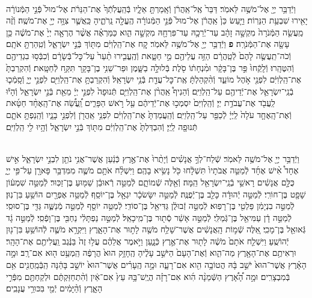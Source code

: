 \documentclass[twoside, openany, parskip=half, 11pt]{book}
\begin{document}
\begin{footnotesize}
\begin{multicols}{2}
\\
וַיְֿדַבֵּ֥ר יְיָ֖ אֶל־מֹשֶׁ֥ה לֵּאמֹֽר׃ דַּבֵּר֙ אֶֽל־אַֽהֲרֹ֔ן וְֿאָֽמַרְתָּ֖ אֵלָ֑יו בְּֿהַֽעֲלֹֽתְֿךָ֙ אֶת־הַנֵּרֹ֔ת אֶל־מוּל֙ פְּֿנֵ֣י הַמְּֿנוֹרָ֔ה יָאִ֖ירוּ שִׁבְעַ֥ת הַנֵּרֽוֹת׃ וַיַּ֤עַשׂ כֵּן֙ אַֽהֲרֹ֔ן אֶל־מוּל֙ פְּֿנֵ֣י הַמְּֿנוֹרָ֔ה הֶֽעֱלָ֖ה נֵֽרֹתֶ֑יהָ כַּֽאֲשֶׁ֛ר צִוָּ֥ה יְיָ֖ אֶת־מֹשֶֽׁה׃ וְֿזֶ֨ה מַֽעֲשֵׂ֤ה הַמְּֿנֹרָה֙ מִקְשָׁ֣ה זָהָ֔ב עַד־יְֿרֵכָ֥הּ עַד־פִּרְחָ֖הּ מִקְשָׁ֣ה הִ֑וא כַּמַּרְאֶ֗ה אֲשֶׁ֨ר הֶרְאָ֤ה יְיָ֙ אֶת־מֹשֶׁ֔ה כֵּ֥ן עָשָׂ֖ה אֶת־הַמְּֿנֹרָֽה׃ \textbf{פ}
וַיְֿדַבֵּ֥ר יְיָ֖ אֶל־מֹשֶׁ֥ה לֵּאמֹֽר׃ קַ֚ח אֶת־הַֽלְוִיִּ֔ם מִתּ֖וֹךְ בְּֿנֵ֣י יִשְׂרָאֵ֑ל וְֿטִֽהַרְתָּ֖ אֹתָֽם׃ וְֿכֹה־תַֽעֲשֶׂ֤ה לָהֶם֙ לְֿטַֽהֲרָ֔ם הַזֵּ֥ה עֲלֵיהֶ֖ם מֵ֣י חַטָּ֑את וְֿהֶֽעֱבִ֤ירוּ תַ֨עַר֙ עַל־כׇּל־בְּֿשָׂרָ֔ם וְֿכִבְּֿס֥וּ בִגְדֵיהֶ֖ם וְֿהִטֶּהָֽרוּ׃ וְֿלָֽקְֿחוּ֙ פַּ֣ר בֶּן־בָּקָ֔ר וּמִ֨נְחָת֔וֹ סֹ֖לֶת בְּֿלוּלָ֣ה בַשָּׁ֑מֶן וּפַר־שֵׁנִ֥י בֶן־בָּקָ֖ר תִּקַּ֥ח לְֿחַטָּֽאת׃ וְֿהִקְרַבְתָּ֙ אֶת־הַֽלְוִיִּ֔ם לִפְנֵ֖י אֹ֣הֶל מוֹעֵ֑ד וְֿהִ֨קְהַלְתָּ֔ אֶֽת־כׇּל־עֲדַ֖ת בְּֿנֵ֥י יִשְׂרָאֵֽל׃  וְֿהִקְרַבְתָּ֥ אֶת־הַֽלְוִיִּ֖ם לִפְנֵ֣י יְיָ֑ וְֿסָֽמְֿכ֧וּ בְֿנֵֽי־יִשְׂרָאֵ֛ל אֶת־יְֿדֵיהֶ֖ם עַל־הַֽלְוִיִּֽם׃ וְֿהֵנִיף֩ אַֽהֲרֹ֨ן אֶת־הַֽלְוִיִּ֤ם תְּֿנוּפָה֙ לִפְנֵ֣י יְיָ֔ מֵאֵ֖ת בְּֿנֵ֣י יִשְׂרָאֵ֑ל וְֿהָי֕וּ לַֽעֲבֹ֖ד אֶת־עֲבֹדַ֥ת יְיָ׃ וְֿהַֽלְוִיִּם֙ יִסְמְכ֣וּ אֶת־יְֿדֵיהֶ֔ם עַ֖ל רֹ֣אשׁ הַפָּרִ֑ים וַֽ֠עֲשֵׂ֠ה אֶת־הָֽאֶחָ֨ד חַטָּ֜את וְֿאֶת־הָֽאֶחָ֤ד עֹלָה֙ לַֽיְיָ֔ לְֿכַפֵּ֖ר עַל־הַֽלְוִיִּֽם׃ וְֿהַֽעֲמַדְתָּ֙ אֶת־הַֽלְוִיִּ֔ם לִפְנֵ֥י אַֽהֲרֹ֖ן וְֿלִפְנֵ֣י בָנָ֑יו וְֿהֵֽנַפְתָּ֥ אֹתָ֛ם תְּֿנוּפָ֖ה לַֽיְיָ׃ וְֿהִבְדַּלְתָּ֙ אֶת־הַֽלְוִיִּ֔ם מִתּ֖וֹךְ בְּֿנֵ֣י יִשְׂרָאֵ֑ל וְֿהָ֥יוּ לִ֖י הַֽלְוִיִּֽם׃

\\
וַיְֿדַבֵּ֥ר יְיָ֖ אֶל־מֹשֶׁ֥ה לֵּאמֹֽר׃ שְֿׁלַח־לְךָ֣ אֲנָשִׁ֗ים וְֿיָתֻ֨רוּ֙ אֶת־אֶ֣רֶץ כְּֿנַ֔עַן אֲשֶׁר־אֲנִ֥י נֹתֵ֖ן לִבְנֵ֣י יִשְׂרָאֵ֑ל אִ֣ישׁ אֶחָד֩ אִ֨ישׁ אֶחָ֜ד לְֿמַטֵּ֤ה אֲבֹתָיו֙ תִּשְׁלָ֔חוּ כֹּ֖ל נָשִׂ֥יא בָהֶֽם׃ וַיִּשְׁלַ֨ח אֹתָ֥ם מֹשֶׁ֛ה מִמִּדְבַּ֥ר פָּארָ֖ן עַל־פִּ֣י יְיָ֑ כֻּלָּ֣ם אֲנָשִׁ֔ים רָאשֵׁ֥י בְֿנֵֽי־יִשְׂרָאֵ֖ל הֵֽמָּה׃  וְֿאֵ֖לֶּה שְֿׁמוֹתָ֑ם לְֿמַטֵּ֣ה רְֿאוּבֵ֔ן שַׁמּ֖וּעַ בֶּן־זַכּֽוּר׃ לְֿמַטֵּ֣ה שִׁמְע֔וֹן שָׁפָ֖ט בֶּן־חוֹרִֽי׃ לְֿמַטֵּ֣ה יְֿהוּדָ֔ה כָּלֵ֖ב בֶּן־יְֿפֻנֶּֽה׃ לְֿמַטֵּ֣ה יִשָּׂשׂכָ֔ר יִגְאָ֖ל בֶּן־יוֹסֵֽף׃ לְֿמַטֵּ֥ה אֶפְרָ֖יִם הוֹשֵׁ֥עַ בִּן־נֽוּן׃ לְֿמַטֵּ֣ה בִנְיָמִ֔ן פַּלְטִ֖י בֶּן־רָפֽוּא׃ לְֿמַטֵּ֣ה זְֿבוּלֻ֔ן גַּדִּיאֵ֖ל בֶּן־סוֹדִֽי׃ לְֿמַטֵּ֥ה יוֹסֵ֖ף לְֿמַטֵּ֣ה מְֿנַשֶּׁ֑ה גַּדִּ֖י בֶּן־סוּסִֽי׃ לְֿמַטֵּ֣ה דָ֔ן עַמִּיאֵ֖ל בֶּן־גְּֿמַלִּֽי׃ לְֿמַטֵּ֣ה אָשֵׁ֔ר סְֿת֖וּר בֶּן־מִֽיכָאֵֽל׃ לְֿמַטֵּ֣ה נַפְתָּלִ֔י נַחְבִּ֖י בֶּן־וָפְֿסִֽי׃ לְֿמַטֵּ֣ה גָ֔ד גְּֿאוּאֵ֖ל בֶּן־מָכִֽי׃ אֵ֚לֶּה שְֿׁמ֣וֹת הָֽאֲנָשִׁ֔ים אֲשֶׁר־שָׁלַ֥ח מֹשֶׁ֖ה לָת֣וּר אֶת־הָאָ֑רֶץ וַיִּקְרָ֥א מֹשֶׁ֛ה לְֿהוֹשֵׁ֥עַ בִּן־נ֖וּן יְֿהוֹשֻֽׁעַ׃  וַיִּשְׁלַ֤ח אֹתָם֙ מֹשֶׁ֔ה לָת֖וּר אֶת־אֶ֣רֶץ כְּֿנָ֑עַן וַיֹּ֣אמֶר אֲלֵהֶ֗ם עֲל֥וּ זֶה֙ בַּנֶּ֔גֶב וַֽעֲלִיתֶ֖ם אֶת־הָהָֽר׃ וּרְאִיתֶ֥ם אֶת־הָאָ֖רֶץ מַה־הִ֑וא וְֿאֶת־הָעָם֙ הַיֹּשֵׁ֣ב עָלֶ֔יהָ הֶֽחָזָ֥ק הוּא֙ הֲרָפֶ֔ה הַֽמְעַ֥ט ה֖וּא אִם־רָֽב׃ וּמָ֣ה הָאָ֗רֶץ אֲשֶׁר־הוּא֙ יֹשֵׁ֣ב בָּ֔הּ הֲטוֹבָ֥ה הִ֖וא אִם־רָעָ֑ה וּמָ֣ה הֶֽעָרִ֗ים אֲשֶׁר־הוּא֙ יוֹשֵׁ֣ב בָּהֵ֔נָּה הַֽבְּֿמַֽחֲנִ֖ים אִ֥ם בְּֿמִבְצָרִֽים׃ וּמָ֣ה הָ֠אָ֠רֶץ הַשְּֿׁמֵנָ֨ה הִ֜וא אִם־רָזָ֗ה הֲיֶֽשׁ־בָּ֥הּ עֵץ֙ אִם־אַ֔יִן וְֿהִ֨תְחַזַּקְתֶּ֔ם וּלְקַחְתֶּ֖ם מִפְּֿרִ֣י הָאָ֑רֶץ וְֿהַ֨יָּמִ֔ים יְֿמֵ֖י בִּכּוּרֵ֥י עֲנָבִֽים׃


\end{multicols}
\end{footnotesize}
\end{document}
